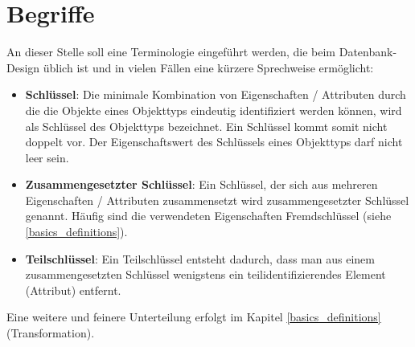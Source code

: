           \begin{center}
          \end{center}

      \section{Begriffe}
        An dieser Stelle soll eine Terminologie eingef\"uhrt werden, die beim Datenbank-Design \"ublich ist und in vielen F\"allen eine k\"urzere Sprechweise erm\"oglicht:
        \begin{itemize}
          \item \textbf{Schl\"ussel}: Die minimale Kombination von Eigenschaften / Attributen durch die die Objekte eines Objekttyps eindeutig identifiziert werden k\"onnen, wird als Schl\"us\-sel des Objekttyps bezeichnet. Ein Schl\"ussel kommt somit nicht doppelt vor. Der Eigenschaftswert des Schl\"ussels eines Objekttyps darf nicht leer sein.
          \item \textbf{Zusammengesetzter Schl\"ussel}: Ein Schl\"ussel, der sich aus mehreren Eigenschaften / Attributen zusammensetzt wird zusammengesetzter Schl\"ussel genannt. H\"aufig sind die verwendeten Eigenschaften Fremdschl\"ussel (siehe \ref{basics_definitions}).
          \item \textbf{Teilschl\"ussel}: Ein Teilschl\"ussel entsteht dadurch, dass man aus einem zusammengesetzten Schl\"ussel wenigstens ein teilidentifizierendes Element (Attribut) entfernt.
        \end{itemize}
        Eine weitere und feinere Unterteilung erfolgt im Kapitel \ref{basics_definitions} (Transformation).
\clearpage
